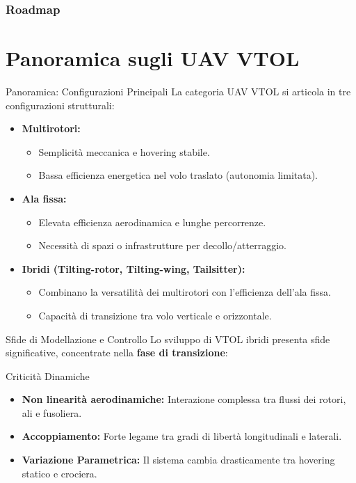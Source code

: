 \documentclass[aspectratio=169]{beamer}
\begin{document}
\frame{\titlepage}

\begin{frame}
\frametitle{Roadmap}
\tableofcontents
\end{frame}

\section{Panoramica sugli UAV VTOL}

\begin{frame}{Panoramica: Configurazioni Principali}
    La categoria UAV VTOL si articola in tre configurazioni strutturali:
    \begin{itemize}
        \item \textbf{Multirotori:}
        \begin{itemize}
            \item Semplicità meccanica e hovering stabile.
            \item Bassa efficienza energetica nel volo traslato (autonomia limitata).
        \end{itemize}
        \item \textbf{Ala fissa:}
        \begin{itemize}
            \item Elevata efficienza aerodinamica e lunghe percorrenze.
            \item Necessità di spazi o infrastrutture per decollo/atterraggio.
        \end{itemize}
        \item \textbf{Ibridi (Tilting-rotor, Tilting-wing, Tailsitter):}
        \begin{itemize}
            \item Combinano la versatilità dei multirotori con l'efficienza dell'ala fissa.
            \item Capacità di transizione tra volo verticale e orizzontale.
        \end{itemize}
    \end{itemize}
\end{frame}

\begin{frame}{Sfide di Modellazione e Controllo}
    Lo sviluppo di VTOL ibridi presenta sfide significative, concentrate nella \textbf{fase di transizione}:
    \begin{block}{Criticità Dinamiche}
        \begin{itemize}
            \item \textbf{Non linearità aerodinamiche:} Interazione complessa tra flussi dei rotori, ali e fusoliera.
            \item \textbf{Accoppiamento:} Forte legame tra gradi di libertà longitudinali e laterali.
            \item \textbf{Variazione Parametrica:} Il sistema cambia drasticamente tra hovering statico e crociera.
        \end{itemize}
    \end{block}
\end{frame}
\end{document}
